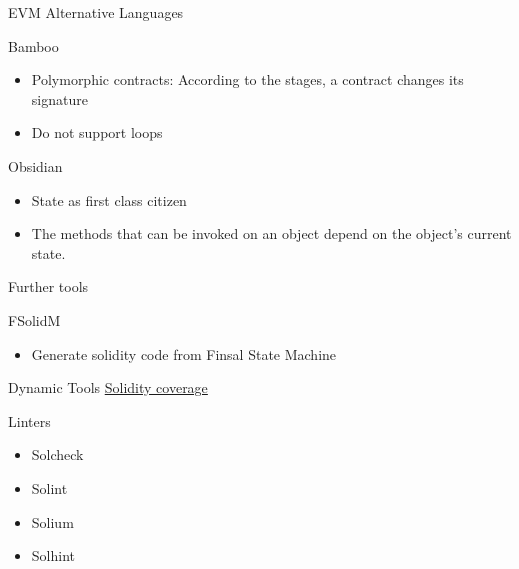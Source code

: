 

\begin{frame}{EVM Alternative Languages}
\begin{block}{Bamboo~\cite{bamboo}}
\begin{itemize}
\item Polymorphic contracts: According to the stages, a contract changes its signature
\item Do not support loops
\end{itemize}
\end{block}

\begin{block}{Obsidian~\cite{obsidian}}
  \begin{itemize}
  \item State as first class citizen
  \item The methods that can be invoked on an object depend on the object’s current state.
  \end{itemize}
\end{block}
\end{frame}


\begin{frame}{Further tools}

\begin{block}{FSolidM~\cite{bib:FSolidM}}
\begin{itemize}
\item Generate solidity code from Finsal State Machine
\end{itemize}
\end{block}

\begin{block}{Dynamic Tools}
\href{https://github.com/sc-forks/solidity-coverage}{Solidity coverage}
\end{block}

\begin{block}{Linters}
\begin{itemize}
\item Solcheck
\item Solint
\item Solium
\item Solhint
\end{itemize}
\end{block}


\end{frame}
